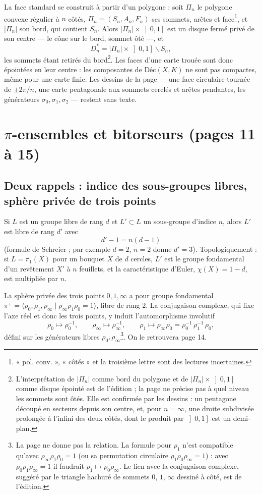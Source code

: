 \documentclass[11pt,a4paper]{article}
\begin{document}
La face standard se construit à partir d'un polygone : soit $\Pi_n$ le polygone
convexe régulier à $n$ côtés, $\Pi_n = (S_n, A_n, F_n)$ ses sommets, arêtes et
face\footnote{« pol. conv. », « côtés » et la troisième lettre sont des lectures
incertaines.}, et $|\Pi_n|$ son bord, qui contient $S_n$. Alors
$|\Pi_n| \times \left]0,1\right]$ est un disque fermé privé de son centre — le cône
sur le bord, sommet ôté —, et
\[
D_n^{*} = |\Pi_n| \times \left]0,1\right] \smallsetminus S_n ,
\]
les sommets étant retirés du bord\footnote{L'interprétation de $|\Pi_n|$ comme
bord du polygone et de $|\Pi_n| \times \left]0,1\right]$ comme disque épointé est
de l'édition ; la page ne précise pas à quel niveau les sommets sont ôtés. Elle
est confirmée par les dessins : un pentagone découpé en secteurs depuis son
centre, et, pour $n = \infty$, une droite subdivisée prolongée à l'infini des
deux côtés, dont le produit par $\left]0,1\right]$ est un demi-plan.}. Les faces
d'une carte trouée sont donc épointées en leur centre : les composantes de
$\text{Déc}(X, K)$ ne sont pas compactes, même pour une carte finie. Les dessins de la page — une
face circulaire tournée de $\pm 2\pi/n$, une carte pentagonale aux sommets
cerclés et arêtes pendantes, les générateurs $\sigma_0, \sigma_1, \sigma_2$ — restent
sans texte.

\section*{$\pi$-ensembles et bitorseurs (pages 11 à 15)}

\subsection*{Deux rappels : indice des sous-groupes libres, sphère privée de trois points}

Si $L$ est un groupe libre de rang $d$ et $L' \subset L$ un sous-groupe d'indice
$n$, alors $L'$ est libre de rang $d'$ avec
\[
d' - 1 = n(d - 1)
\]
(formule de Schreier ; par exemple $d = 2$, $n = 2$ donne $d' = 3$). Topologiquement :
si $L = \pi_1(X)$ pour un bouquet $X$ de $d$ cercles, $L'$ est le groupe
fondamental d'un revêtement $X'$ à $n$ feuillets, et la caractéristique
d'Euler, $\chi(X) = 1 - d$, est multipliée par $n$.

La sphère privée des trois points $0, 1, \infty$ a pour groupe fondamental
$\pi^{+} = \langle \rho_0, \rho_1, \rho_\infty \mid \rho_\infty \rho_1 \rho_0 = 1 \rangle$, libre
de rang $2$. La conjugaison complexe, qui fixe l'axe réel et donc les trois
points, y induit l'automorphisme involutif
\[
\rho_0 \mapsto \rho_0^{-1}, \qquad \rho_\infty \mapsto \rho_\infty^{-1}, \qquad
\rho_1 \mapsto \rho_\infty \rho_0 = \rho_0^{-1}\,\rho_1^{-1}\,\rho_0 ,
\]
défini sur les générateurs libres $\rho_0, \rho_\infty$\footnote{La page ne donne pas
la relation. La formule pour $\rho_1$ n'est compatible qu'avec
$\rho_\infty \rho_1 \rho_0 = 1$ (ou sa permutation circulaire
$\rho_1\rho_0\rho_\infty = 1$) : avec $\rho_0\rho_1\rho_\infty = 1$ il faudrait
$\rho_1 \mapsto \rho_0 \rho_\infty$. Le lien avec la conjugaison complexe, suggéré
par le triangle hachuré de sommets $0$, $1$, $\infty$ dessiné à côté, est de
l'édition.}. On le retrouvera page 14.
\end{document}
